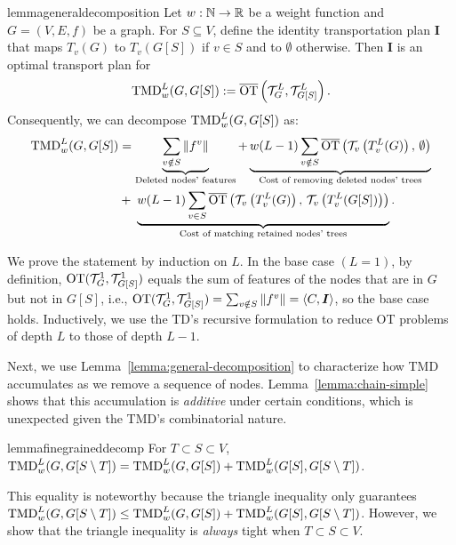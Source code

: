 \begin{restatable}{lemma}{generaldecomposition}\label{lemma:general-decomposition} Let {$w: {\mathbb N} \to \mathbb R$ be a weight function and} $G = (V, E, f)$ be a graph.
For $S \subseteq V$, define the identity transportation plan $\bm{I}$ that maps $T_v(G)$ to $T_v(G[S])$ if $v \in S$ and to $\emptyset$ otherwise. Then $\bm{I}$ is an optimal transport plan for
\begin{align}\label{eq:ot-problem}
    \textnormal{TMD}_w^L(G, G[S]) := \smash{\overline{\textnormal{OT}}}\left(\mathcal T_G^L, \mathcal T_{G[S]}^L \right ).
\end{align}
Consequently, we can decompose $\textnormal{TMD}_w^L(G, G[S])$ as: 
\begin{align}
    \textnormal{TMD}_w^L(G, G[S]) \label{eq:decomposition} &= \underbrace{\sum_{v \notin S} \|f^v\|}_{\textnormal{Deleted nodes' features}} +\underbrace{w(L-1)\sum_{v \notin S} \smash{\overline{\textnormal{OT}}}
    \left(\mathcal T_v\left(T_v^L(G)\right),\,\emptyset\right)}_{\textnormal{Cost of removing deleted nodes' trees}}\\
    &+\;
    \underbrace{w(L-1)\sum_{v \in S} \smash{\overline{\textnormal{OT}}}
    \left(\mathcal T_v\left(T_v^L(G)\right),\, \mathcal T_v\left(T_v^L(G[S])\right)\right)}_{\textnormal{Cost of matching retained nodes' trees}}.\nonumber
\end{align}
\end{restatable}
\begin{hproof} We prove the statement by induction on $L$. In the base case $(L= 1)$, by definition, $\textnormal{OT}(\mathcal T_G^1, \mathcal T_{G[S]}^1)$ 
equals the sum of features of the nodes that are in $G$ but not in $G[S]$, i.e., $\textnormal{OT}(\mathcal T_G^1, \mathcal T_{G[S]}^1) = \sum_{v \notin S} \Vert f^v \Vert = \langle C, \bm{I} \rangle$, so the base case holds. Inductively, we use the TD's recursive formulation to reduce OT problems of depth $L$ to those of depth $L-1$.
\end{hproof}

Next, we use Lemma~\ref{lemma:general-decomposition} to characterize how TMD accumulates as we remove a sequence of nodes. Lemma~\ref{lemma:chain-simple} shows that this accumulation is \emph{additive} under certain conditions, which is unexpected given the TMD's combinatorial nature.


\begin{restatable}{lemma}{finegraineddecomp}\label{lemma:chain-simple} 
For $T \subset S \subset V$, $\textnormal{TMD}_w^L(G, G[S \setminus T ]) = \textnormal{TMD}_w^L(G, G[S]) + \textnormal{TMD}_w^L(G[S], G[S\setminus T])$.  
\end{restatable}

 This equality is noteworthy because the triangle inequality only guarantees $\textnormal{TMD}_w^L(G, G[S \setminus T ]) \leq \textnormal{TMD}_w^L(G, G[S]) + \textnormal{TMD}_w^L(G[S], G[S\setminus T])$. However, we show that the triangle inequality is \emph{always} tight when $T \subset S \subset V$.

